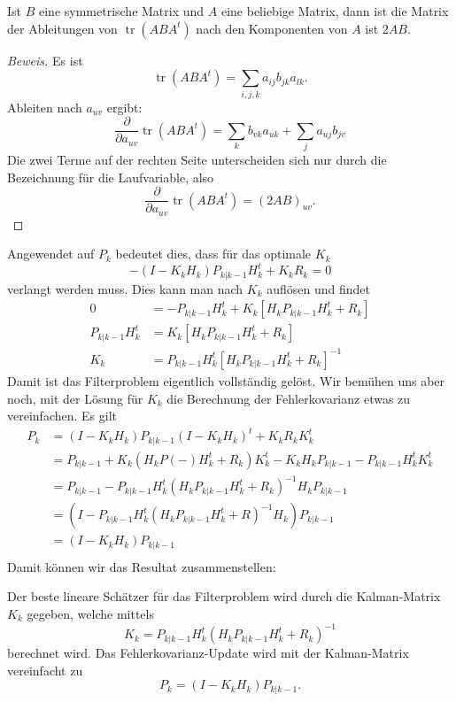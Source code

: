 \begin{hilfssatz}Ist $B$ eine symmetrische Matrix und $A$ eine beliebige
Matrix, dann ist die Matrix der Ableitungen von $\operatorname{tr}(ABA^t)$
nach den Komponenten von $A$  ist $2AB$.
\end{hilfssatz}

\begin{proof}[Beweis]
Es ist
\[
\operatorname{tr}(ABA^t)=\sum_{i,j,k}a_{ij}b_{jk}a_{lk}.
\]
Ableiten nach $a_{uv}$ ergibt:
\[
\frac{\partial}{\partial a_{uv}}\operatorname{tr}(ABA^t)
=\sum_{k}b_{vk}a_{uk}+\sum_{j}a_{uj}b_{jv}
\]
Die zwei Terme auf der rechten Seite unterscheiden sich nur durch
die Bezeichnung für die Laufvariable, also
\[
\frac{\partial}{\partial a_{uv}}\operatorname{tr}(ABA^t)
=(2AB)_{uv}.
\]
\end{proof}

Angewendet auf $P_{k}$ bedeutet dies, dass für das optimale $K_k$
\[
-(I-K_kH_{k})P_{k|k-1}H_{k}^t +K_kR_k=0
\]
verlangt werden muss.
Dies kann man nach $K_k$ auflösen und findet
\begin{align*}
0&=-P_{k|k-1}H_{k}^t +K_k[H_{k}P_{k|k-1}H_{k}^t +R_{k}]\\
P_{k|k-1}H_{k}^t&=K_k[H_{k}P_{k|k-1}H_{k}^t +R_{k}]\\
K_k&= P_{k|k-1}H_{k}^t [H_{k}P_{k|k-1}H_{k}^t +R_{k}]^{-1}
\end{align*}
Damit ist das Filterproblem eigentlich vollständig gelöst.
Wir bemühen uns
aber noch, mit der Lösung für $K_k$ die Berechnung der Fehlerkovarianz etwas zu
vereinfachen.
Es gilt
\begin{align*}
P_{k}&=(I-K_{k}H_{k})P_{k|k-1}(I-K_{k}H_{k})^t+K_{k}R_kK_{k}^t\\
&=P_{k|k-1} + K_{k}(H_{k}P(-)H_{k}^t+R_k)K_{k}^t -K_{k}H_{k}P_{k|k-1}-P_{k|k-1}H_{k}^tK_{k}^t\\
&=P_{k|k-1} - P_{k|k-1}H_{k}^t(H_{k}P_{k|k-1}H_{k}^t+R_k)^{-1}H_{k}P_{k|k-1}\\
&=(I-P_{k|k-1}H_{k}^t(H_{k}P_{k|k-1}H_{k}^t + R)^{-1}H_{k})P_{k|k-1}\\
&=(I-K_{k}H_{k})P_{k|k-1}\\
\end{align*}
Damit können wir das Resultat zusammenstellen:
\begin{satz}
Der beste lineare Schätzer für das Filterproblem wird durch die Kalman-Matrix
$K_k$ gegeben, welche mittels
\begin{equation}
K_k=P_{k|k-1}H_k^t(H_kP_{k|k-1}H_k^t+R_k)^{-1}
\label{kalman-gains}
\end{equation}
berechnet wird.
Das Fehlerkovarianz-Update wird mit der Kalman-Matrix
vereinfacht zu
\[
P_k=(I-K_kH_k)P_{k|k-1}.
\]
\end{satz}

